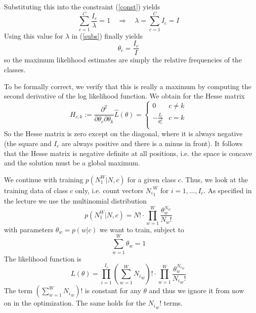 \documentclass[%
   11pt,              %
   ngerman,           %
   a4paper,           %
   DIV11,             %
]{scrartcl}%
\begin{document}
Substituting this into the constraint (\ref{const}) yields
\begin{equation*}
	\sum_{c=1}^C \frac{I_c}{\lambda} = 1 \quad \Rightarrow \quad \lambda = \sum_{c=1}^C I_c = I
\end{equation*}
Using this value for $\lambda$ in (\ref{subs}) finally yields
\begin{equation*}
	\theta_c = \frac{I_c}{I}
\end{equation*}
so the maximum likelihood estimates are simply the relative frequencies of the classes. \par
To be formally correct, we verify that this is really a maximum by computing the second derivative of the log likelihood function. We obtain for the Hesse matrix
\begin{equation*}
	H_{c,k} := \frac{\partial^2}{\partial \theta_c \partial \theta_k} \hat{L}(\theta) = \begin{cases}
	0 & c \neq k \\
	- \frac{I_c}{\theta_c^2} & c = k \\ \end{cases}
\end{equation*}
So the Hesse matrix is zero except on the diagonal, where it is always negative (the square and $I_c$ are always positive and there is a minus in front). It follows that the Hesse matrix is negative definite at all positions, i.e. the space is concave and the solution must be a global maximum. \par
We continue with training $p(N_1^W|N,c)$ for a given class $c$. Thus, we look at the training data of class $c$ only, i.e. count vectors ${N_i}_1^W$ for $i = 1,\ldots,I_c$. As specified in the lecture we use the multinomial distribution
\begin{equation*}
	p(N_1^W|N,c) = N! \cdot \prod_{w=1}^W \frac{\theta_w^{N_w}}{N_w !}
\end{equation*}
with parameters $\theta_w = p(w|c)$ we want to train, subject to
\begin{equation}\label{cons2}
	\sum_{w=1}^W \theta_w = 1
\end{equation}
The likelihood function is 
\begin{equation*}
	L(\theta) = \prod_{i=1}^{I_c} (\sum_{w=1}^W {N_i}_w)! \cdot \prod_{w=1}^W \frac{\theta_w^{{N_i}_w}}{{N_i}_w !}
\end{equation*}
The term $(\sum_{w=1}^W {N_i}_w)!$ is constant for any $\theta$ and thus we ignore it from now on in the optimization. The same holds for the ${N_i}_w !$ terms.\\
\end{document}
